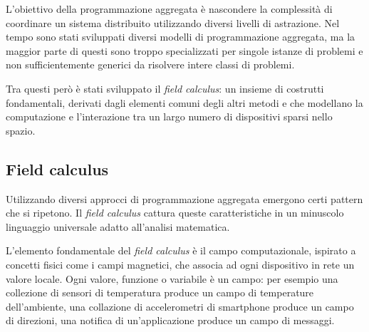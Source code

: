 L'obiettivo della programmazione aggregata è nascondere la complessità di
coordinare un sistema distribuito utilizzando diversi livelli di astrazione.
Nel tempo sono stati sviluppati diversi modelli di programmazione aggregata, ma
la maggior parte di questi sono troppo specializzati per singole istanze di
problemi e non sufficientemente generici da risolvere intere classi di
problemi\cite{beal2012}.

Tra questi però è stati sviluppato il \textit{field calculus}: un insieme di
costrutti fondamentali, derivati dagli elementi comuni degli altri metodi e che
modellano la computazione e l'interazione tra un largo numero di dispositivi
sparsi nello spazio.

\subsection{Field calculus}
Utilizzando diversi approcci di programmazione aggregata emergono certi pattern
che si ripetono. Il \textit{field calculus} \cite{Viroli2013} cattura queste
caratteristiche in un minuscolo linguaggio universale adatto all'analisi
matematica.

L'elemento fondamentale del \textit{field calculus} è il campo computazionale,
ispirato a concetti fisici come i campi magnetici, che associa ad ogni
dispositivo in rete un valore locale. Ogni valore, funzione o variabile è un
campo: per esempio una collezione di sensori di temperatura produce un campo di
temperature dell'ambiente, una collazione di accelerometri di smartphone produce
un campo di direzioni, una notifica di un'applicazione produce un campo di
messaggi.

